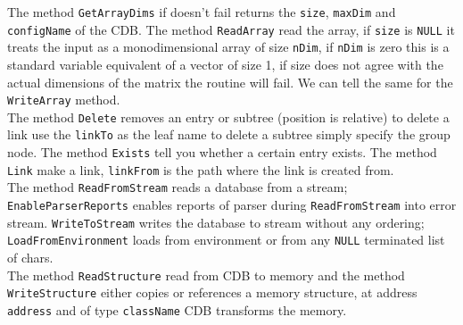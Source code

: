 The method \texttt{GetArrayDims} if doesn't fail returns the \texttt{size}, \texttt{maxDim} and \texttt{configName} of the CDB. The method \texttt{ReadArray} read the array, if \texttt{size} is \texttt{NULL} it treats the input as a monodimensional array of size \texttt{nDim}, if \texttt{nDim} is zero this is a standard variable equivalent of a vector of size 1, if size does not agree with the actual dimensions of the matrix the routine will fail. We can tell the same for the \texttt{WriteArray} method.\\


The method \texttt{Delete} removes an entry or subtree (position is relative) to delete a link use the \texttt{linkTo} as the leaf name to delete a subtree simply specify the group node. The method \texttt{Exists} tell you whether a certain entry exists. The method \texttt{Link} make a link, \texttt{linkFrom} is the path where the link is created from.\\


The method \texttt{ReadFromStream} reads a database from a stream; \texttt{EnableParserReports} enables reports of parser during \texttt{ReadFromStream} into error stream. \texttt{WriteToStream} writes the database to stream without any ordering; \texttt{LoadFromEnvironment} loads from environment or from any \texttt{NULL} terminated list of chars.\\


The method \texttt{ReadStructure} read from CDB to memory and the method \texttt{WriteStructure} either copies or references a memory structure, at address \texttt{address} and of type \texttt{className} CDB transforms the memory.

